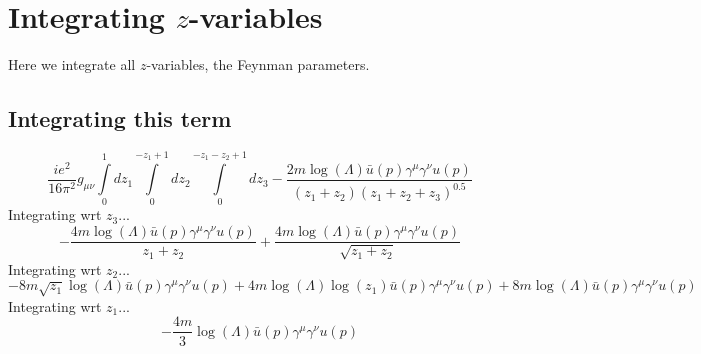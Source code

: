 \section*{Integrating $z$-variables}
Here we integrate all $z$-variables, the Feynman parameters.
\subsection*{Integrating this term}
\begin{dmath}\frac{i e^{2}}{16 \pi^{2}}g_{ \mu \nu }\int\limits_{ 0 }^{ 1 } d{ z_{ 1 } }\int\limits_{ 0 }^{ - { z_{ 1 } } + 1 } d{ z_{ 2 } }\int\limits_{ 0 }^{ - { z_{ 1 } } - { z_{ 2 } } + 1 } d{ z_{ 3 } }- \frac{2 m \log{\left (\Lambda \right )} { \bar{u}(p) } { \gamma^{ \mu } } { \gamma^{ \nu } } u({ p })}{\left({ z_{ 1 } } + { z_{ 2 } }\right) \left({ z_{ 1 } } + { z_{ 2 } } + { z_{ 3 } }\right)^{0.5}}\end{dmath}
Integrating wrt ${ z_{ 3 } }$...
\begin{dmath}- \frac{4 m \log{\left (\Lambda \right )} { \bar{u}(p) } { \gamma^{ \mu } } { \gamma^{ \nu } } u({ p })}{{ z_{ 1 } } + { z_{ 2 } }} + \frac{4 m \log{\left (\Lambda \right )} { \bar{u}(p) } { \gamma^{ \mu } } { \gamma^{ \nu } } u({ p })}{\sqrt{{ z_{ 1 } } + { z_{ 2 } }}}\end{dmath}
Integrating wrt ${ z_{ 2 } }$...
\begin{dmath}- 8 m \sqrt{{ z_{ 1 } }} \log{\left (\Lambda \right )} { \bar{u}(p) } { \gamma^{ \mu } } { \gamma^{ \nu } } u({ p }) + 4 m \log{\left (\Lambda \right )} \log{\left ({ z_{ 1 } } \right )} { \bar{u}(p) } { \gamma^{ \mu } } { \gamma^{ \nu } } u({ p }) + 8 m \log{\left (\Lambda \right )} { \bar{u}(p) } { \gamma^{ \mu } } { \gamma^{ \nu } } u({ p })\end{dmath}
Integrating wrt ${ z_{ 1 } }$...
\begin{dmath}- \frac{4 m}{3} \log{\left (\Lambda \right )} { \bar{u}(p) } { \gamma^{ \mu } } { \gamma^{ \nu } } u({ p })\end{dmath}
